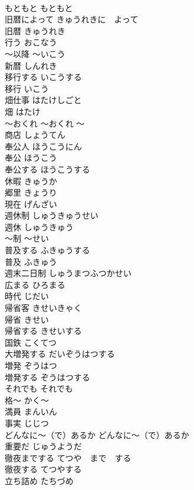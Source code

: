 \documentclass[8pt]{extreport}
\begin{document}
\begin{CJK}{UTF8}{min}
\\	もともと	もともと	
\\	旧暦によって	きゅうれきに　よって	
\\	旧暦	きゅうれき	
\\	行う	おこなう	
\\	〜以降	〜いこう	
\\	新暦	しんれき	
\\	移行する	いこうする	
\\	移行	いこう	
\\	畑仕事	はたけしごと	
\\	畑	はたけ	
\\	〜おくれ	〜おくれ	〜
\\	商店	しょうてん	
\\	奉公人	ほうこうにん	
\\	奉公	ほうこう	
\\	奉公する	ほうこうする	
\\	休暇	きゅうか	
\\	郷里	きょうり	
\\	現在	げんざい	
\\	週休制	しゅうきゅうせい	
\\	週休	しゅうきゅう	
\\	〜制	〜せい	
\\	普及する	ふきゅうする	
\\	普及	ふきゅう	
\\	週末二日制	しゅうまつふつかせい	
\\	広まる	ひろまる	
\\	時代	じだい	
\\	帰省客	きせいきゃく	
\\	帰省	きせい	
\\	帰省する	きせいする	
\\	国鉄	こくてつ	
\\	大増発する	だいぞうはつする	
\\	増発	ぞうはつ	
\\	増発する	ぞうはつする	
\\	それでも	それでも	
\\	格〜	かく〜	
\\	満員	まんいん	
\\	事実	じじつ	
\\	どんなに〜（で）あるか	どんなに〜（で）あるか	
\\	重要だ	じゅうようだ	
\\	徹夜までする	てつや　まで　する	
\\	徹夜する	てつやする	
\\	立ち詰め	たちづめ	

\end{CJK}
\end{document}
